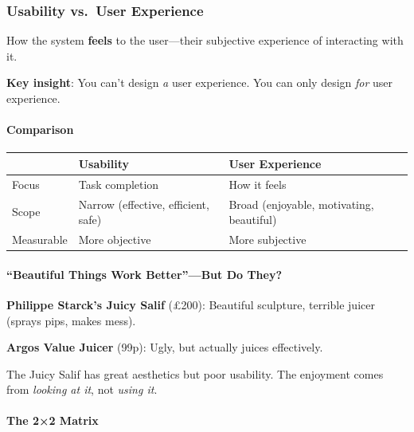 \subsubsection*{Usability vs.\ User Experience}

\begin{defbox}
How the system \textbf{feels} to the user---their subjective experience of interacting with it.

\textbf{Key insight}: You can't design \textit{a} user experience. You can only design \textit{for} user experience.
\end{defbox}

\paragraph*{Comparison}

\begin{center}
\renewcommand{\arraystretch}{1.3}
\begin{tabular}{@{} l p{5cm} p{5cm} @{}}
\toprule
& \textbf{Usability} & \textbf{User Experience} \\
\midrule
Focus & Task completion & How it feels \\
Scope & Narrow (effective, efficient, safe) & Broad (enjoyable, motivating, beautiful) \\
Measurable & More objective & More subjective \\
\bottomrule
\end{tabular}
\end{center}

\paragraph*{``Beautiful Things Work Better''---But Do They?}

\begin{exbox}
\textbf{Philippe Starck's Juicy Salif} (£200): Beautiful sculpture, terrible juicer (sprays pips, makes mess).

\textbf{Argos Value Juicer} (99p): Ugly, but actually juices effectively.

The Juicy Salif has great aesthetics but poor usability. The enjoyment comes from \textit{looking at it}, not \textit{using it}.
\end{exbox}

\paragraph*{The 2×2 Matrix}

